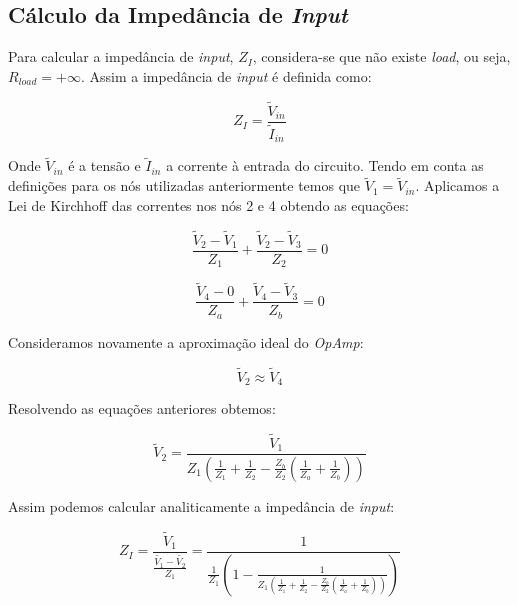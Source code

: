 \subsection{Cálculo da Impedância de \emph{Input}}

Para calcular a impedância de \emph{input}, $Z_I$, considera-se que não existe \emph{load}, ou seja, $R_{load} = +\infty$.
Assim a impedância de \emph{input} é definida como:

\begin{equation}
    Z_I = \frac{\widetilde{V}_{in}}{\widetilde{I}_{in}}
\end{equation}

Onde $\widetilde{V}_{in}$ é a tensão e $\widetilde{I}_{in}$ a corrente à entrada do circuito.
Tendo em conta as definições para os nós utilizadas anteriormente temos que $\widetilde{V}_1 = \widetilde{V}_{in}$. Aplicamos a Lei de Kirchhoff
das correntes nos nós 2 e 4 obtendo as equações:

\begin{equation}
    \frac{\widetilde{V}_2 - \widetilde{V}_1}{Z_1} + \frac{\widetilde{V}_2 - \widetilde{V}_3}{Z_2} = 0
\end{equation}

\begin{equation}
    \frac{\widetilde{V}_4 - 0}{Z_a} + \frac{\widetilde{V}_4 - \widetilde{V}_3}{Z_b} = 0
\end{equation}

Consideramos novamente a aproximação ideal do \emph{OpAmp}:

\begin{equation}
    \widetilde{V}_2 \approx \widetilde{V}_4
\end{equation}

Resolvendo as equações anteriores obtemos:

\begin{equation}
    \widetilde{V}_2 = \frac{\widetilde{V}_1}{Z_1 (\frac{1}{Z_1} + \frac{1}{Z_2} - \frac{Z_b}{Z_2}(\frac{1}{Z_a} + \frac{1}{Z_b}))}
\end{equation}

Assim podemos calcular analiticamente a impedância de \emph{input}:

\begin{equation}
    Z_I = \frac{\widetilde{V}_1}{\frac{\widetilde{V_1} - \widetilde{V_2}}{Z_1}} = \frac{1}{\frac{1}{Z_1} \left(1 - \frac{1}{Z_1 \left(\frac{1}{Z_1} + \frac{1}{Z_2} - \frac{Z_b}{Z_2}\left(\frac{1}{Z_a} + \frac{1}{Z_b}\right)\right)}\right)}
    \label{eq:ImpedanciaInput}
\end{equation}

